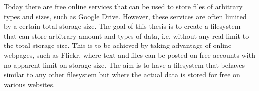 



Today there are free online services that can be used to store files of arbitrary types and sizes, such as Google Drive. However, these services are often limited by a certain total storage size. The goal of this thesis is to create a filesystem that can store arbitrary amount and types of data, i.e. without any real limit to the total storage size. This is to be achieved by taking advantage of online webpages, such as Flickr, where text and files can be posted on free accounts with no apparent limit on storage size. The aim is to have a filesystem that behaves similar to any other filesystem but where the actual data is stored for free on various websites. 

